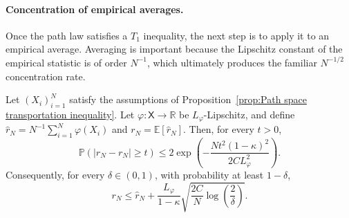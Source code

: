 \paragraph{Concentration of empirical averages.}

Once the path law satisfies a \(T_1\) inequality, the next step is to apply it to an empirical average. Averaging is important because the Lipschitz constant of the empirical statistic is of order \(N^{-1}\), which ultimately produces the familiar \(N^{-1/2}\) concentration rate.

\begin{theorem}
\label{thm:Metric concentration Wasserstein data chain}
Let \((X_i)_{i=1}^N\) satisfy the assumptions of Proposition~\ref{prop:Path space transportation inequality}. Let \(\varphi:\mathsf X\to\mathbb R\) be \(L_\varphi\)-Lipschitz, and define \(\widehat r_N=N^{-1}\sum_{i=1}^N\varphi(X_i)\) and \(r_N=\mathbb E[\widehat r_N]\). Then, for every \(t>0\),
\[
\mathbb P
\left(
|\widehat r_N-r_N|
\geq t
\right)
\leqslant
2
\exp
\left(
-\frac{
Nt^2(1-\kappa)^2
}{
2CL_\varphi^2
}
\right).
\]
Consequently, for every \(\delta\in(0,1)\), with probability at least \(1-\delta\),
\[
r_N
\leqslant
\widehat r_N
+
\frac{L_\varphi}{1-\kappa}
\sqrt{
\frac{2C}{N}
\log
\left(
\frac2\delta
\right)
}.
\]
\end{theorem}

